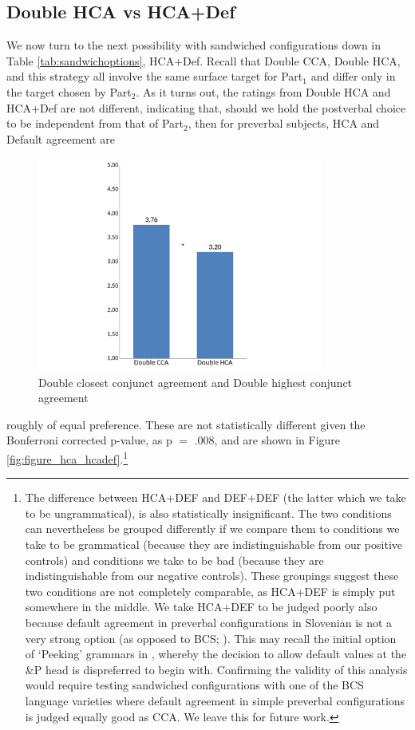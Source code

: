 \documentclass[output=paper
,modfonts
,nonflat]{langsci/langscibook}
\begin{document}
\subsection{Double HCA vs HCA+Def}
We now turn to the next possibility with sandwiched configurations down in Table \ref{tab:sandwichoptions}, HCA+Def. Recall that Double CCA, Double HCA, and this strategy all involve the same surface target for Part$_1$ and differ only in the target chosen by Part$_2$. As it turns out, the ratings from Double HCA and HCA+Def are not different, indicating that, should we hold the postverbal choice to be independent from that of Part$_2$, then for preverbal subjects, HCA and Default agreement are 

\begin{figure}[h]
	\begin{center}
		\includegraphics[height=200pt]{figures/cca_hca_nl.pdf}
	\end{center}
	\caption{Double closest conjunct agreement and Double highest conjunct agreement}
	\label{fig:figure_cca_hca}
\end{figure}
\newpage\noindent roughly of equal preference. These are not statistically different given the Bonferroni corrected p-value, as p $=$ .008, and are shown in Figure \ref{fig:figure_hca_hcadef}.\footnote{The difference between HCA+DEF and DEF+DEF (the latter which we take to be ungrammatical), is also statistically insignificant. The two conditions can nevertheless be grouped differently if we compare them to conditions  we take to be grammatical (because they are indistinguishable from our positive controls) and conditions we take to be bad (because they are indistinguishable from our negative controls). These groupings suggest these two conditions are not completely comparable, as HCA+DEF is simply put somewhere in the middle. We take HCA+DEF to be judged poorly also because default agreement in preverbal configurations in Slovenian is not a very strong option (as opposed to BCS; \citealt{willergold:16}). This may recall the initial option of `Peeking' grammars in \cite{marusicnevinsbadecker:15}, whereby the decision to allow default values at the \&P head is dispreferred to begin with. Confirming the validity of this analysis would require testing sandwiched configurations with one of the BCS language varieties where default agreement in simple preverbal configurations is judged equally good as CCA. We leave this for future work.}
\end{document}
